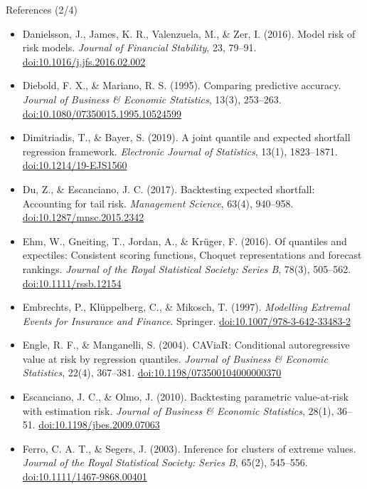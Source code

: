 \begin{frame}{References (2/4)}
\itemsize{\tiny}
\begin{itemize}
    \item Danielsson, J., James, K. R., Valenzuela, M., \& Zer, I. (2016). Model risk of risk models. \textit{Journal of Financial Stability}, 23, 79--91. \href{https://doi.org/10.1016/j.jfs.2016.02.002}{doi:10.1016/j.jfs.2016.02.002}
    \item Diebold, F. X., \& Mariano, R. S. (1995). Comparing predictive accuracy. \textit{Journal of Business \& Economic Statistics}, 13(3), 253--263. \href{https://doi.org/10.1080/07350015.1995.10524599}{doi:10.1080/07350015.1995.10524599}
    \item Dimitriadis, T., \& Bayer, S. (2019). A joint quantile and expected shortfall regression framework. \textit{Electronic Journal of Statistics}, 13(1), 1823--1871. \href{https://doi.org/10.1214/19-EJS1560}{doi:10.1214/19-EJS1560}
    \item Du, Z., \& Escanciano, J. C. (2017). Backtesting expected shortfall: Accounting for tail risk. \textit{Management Science}, 63(4), 940--958. \href{https://doi.org/10.1287/mnsc.2015.2342}{doi:10.1287/mnsc.2015.2342}
    \item Ehm, W., Gneiting, T., Jordan, A., \& Krüger, F. (2016). Of quantiles and expectiles: Consistent scoring functions, Choquet representations and forecast rankings. \textit{Journal of the Royal Statistical Society: Series B}, 78(3), 505--562. \href{https://doi.org/10.1111/rssb.12154}{doi:10.1111/rssb.12154}
    \item Embrechts, P., Klüppelberg, C., \& Mikosch, T. (1997). \textit{Modelling Extremal Events for Insurance and Finance}. Springer. \href{https://doi.org/10.1007/978-3-642-33483-2}{doi:10.1007/978-3-642-33483-2}
    \item Engle, R. F., \& Manganelli, S. (2004). CAViaR: Conditional autoregressive value at risk by regression quantiles. \textit{Journal of Business \& Economic Statistics}, 22(4), 367--381. \href{https://doi.org/10.1198/073500104000000370}{doi:10.1198/073500104000000370}
    \item Escanciano, J. C., \& Olmo, J. (2010). Backtesting parametric value-at-risk with estimation risk. \textit{Journal of Business \& Economic Statistics}, 28(1), 36--51. \href{https://doi.org/10.1198/jbes.2009.07063}{doi:10.1198/jbes.2009.07063}
    \item Ferro, C. A. T., \& Segers, J. (2003). Inference for clusters of extreme values. \textit{Journal of the Royal Statistical Society: Series B}, 65(2), 545--556. \href{https://doi.org/10.1111/1467-9868.00401}{doi:10.1111/1467-9868.00401}

\end{itemize}
\end{frame}
